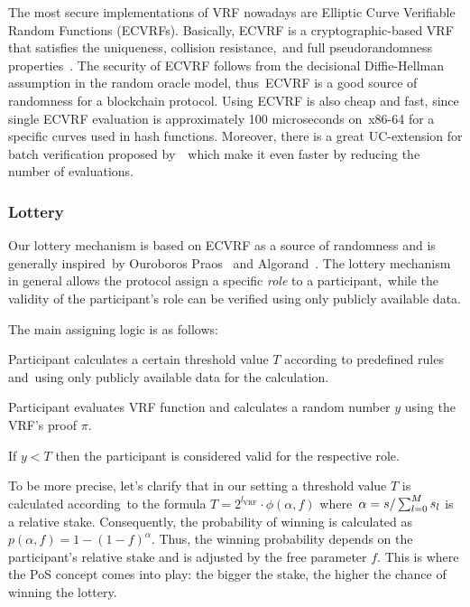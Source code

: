 The most secure implementations of VRF nowadays are Elliptic Curve Verifiable Random Functions (ECVRFs).
Basically, ECVRF is a cryptographic-based VRF that satisfies the uniqueness, collision resistance,\
and full pseudorandomness properties~\cite{cryptoeprint:2014/905}.
The security of ECVRF follows from the decisional Diffie-Hellman assumption in the random oracle model, thus\
ECVRF is a good source of randomness for a blockchain protocol.
Using ECVRF is also cheap and fast, since single ECVRF evaluation is approximately 100 microseconds on\
x86-64 for a specific curves used in hash functions.
Moreover, there is a great UC-extension for batch verification proposed by~\cite{cryptoeprint:2022/1045}\
which make it even faster by reducing the number of evaluations.

\subsubsection{Lottery}
Our lottery mechanism is based on ECVRF as a source of randomness and is generally inspired\
by Ouroboros Praos~\cite{cryptoeprint:2017/573} and Algorand~\cite{cryptoeprint:2017/454}.
The lottery mechanism in general allows the protocol assign a specific \emph{role} to a participant,\
while the validity of the participant's role can be verified using only publicly available data.

The main assigning logic is as follows:
\begin{legal}
    \item Participant calculates a certain threshold value $T$ according to predefined rules and\
    using only publicly available data for the calculation.
    \item Participant evaluates VRF function and calculates a random number $y$ using the VRF's proof $\pi$.
    \item If ${y < T}$ then the participant is considered valid for the respective role.
\end{legal}

To be more precise, let's clarify that in our setting a threshold value $T$ is calculated according\
to the formula ${T = 2^{l_{\text{VRF}}}\cdot \phi(\alpha, f)}$ where\
${\alpha=s/\\\sum_{l=0}^{M} s_l}$ is a relative stake.
Consequently, the probability of winning is calculated as ${p(\alpha, f) = 1-(1-f)^{\alpha}}$.
Thus, the winning probability depends on the participant's relative stake and is adjusted by the free parameter $f$.
This is where the PoS concept comes into play: the bigger the stake, the higher the chance of winning the lottery.

